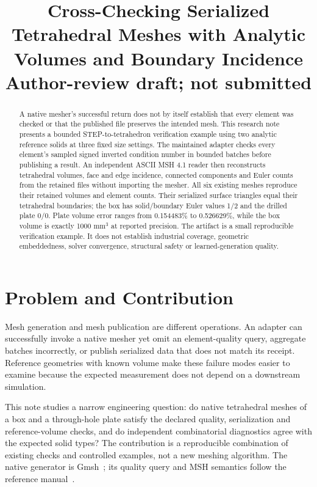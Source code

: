 \documentclass[twoside,leqno,twocolumn]{article}
\title{\Large Cross-Checking Serialized Tetrahedral Meshes with Analytic Volumes and Boundary Incidence\\[0.4em]\normalsize Author-review draft; not submitted}
\author{}
\date{}
\begin{document}
\maketitle
\begin{abstract}
A native mesher's successful return does not by itself establish that every element was checked or that the published file preserves the intended mesh. This research note presents a bounded STEP-to-tetrahedron verification example using two analytic reference solids at three fixed size settings. The maintained adapter checks every element's sampled signed inverted condition number in bounded batches before publishing a result. An independent ASCII MSH 4.1 reader then reconstructs tetrahedral volumes, face and edge incidence, connected components and Euler counts from the retained files without importing the mesher. All six existing meshes reproduce their retained volumes and element counts. Their serialized surface triangles equal their tetrahedral boundaries; the box has solid/boundary Euler values 1/2 and the drilled plate 0/0. Plate volume error ranges from 0.154483\% to 0.526629\%, while the box volume is exactly 1000 mm$^3$ at reported precision. The artifact is a small reproducible verification example. It does not establish industrial coverage, geometric embeddedness, solver convergence, structural safety or learned-generation quality.
\end{abstract}

\section{Problem and Contribution}
Mesh generation and mesh publication are different operations. An adapter can successfully invoke a native mesher yet omit an element-quality query, aggregate batches incorrectly, or publish serialized data that does not match its receipt. Reference geometries with known volume make these failure modes easier to examine because the expected measurement does not depend on a downstream simulation.

This note studies a narrow engineering question: do native tetrahedral meshes of a box and a through-hole plate satisfy the declared quality, serialization and reference-volume checks, and do independent combinatorial diagnostics agree with the expected solid types? The contribution is a reproducible combination of existing checks and controlled examples, not a new meshing algorithm. The native generator is Gmsh~\cite{gmsh2009}; its quality query and MSH semantics follow the reference manual~\cite{gmshmanual}.
\end{document}

